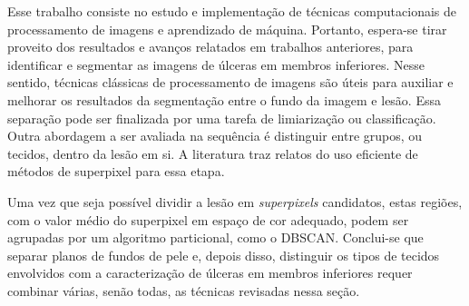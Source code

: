 Esse trabalho consiste no estudo e implementação de técnicas computacionais de processamento de imagens e aprendizado de máquina.
Portanto, espera-se tirar proveito dos resultados e avanços relatados em trabalhos anteriores, para identificar e segmentar as imagens de úlceras em membros inferiores.
Nesse sentido, técnicas clássicas de processamento de imagens são úteis para auxiliar e melhorar os resultados da segmentação entre o fundo da imagem e lesão.
Essa separação pode ser finalizada por uma tarefa de limiarização ou classificação.
Outra abordagem a ser avaliada na sequência é distinguir entre grupos, ou tecidos, dentro da lesão em si.
A literatura traz relatos do uso eficiente de métodos de superpixel para essa etapa.

Uma vez que seja possível dividir a lesão em \textit{superpixels} candidatos, estas regiões, com o valor médio do superpixel em espaço de cor adequado, podem ser agrupadas por um algoritmo particional, como o DBSCAN.
Conclui-se que separar planos de fundos de pele e, depois disso, distinguir os tipos de tecidos envolvidos com a caracterização de úlceras em membros inferiores requer combinar várias, senão todas, as técnicas revisadas nessa seção.
\newpage
\thispagestyle{plain} %
\mbox{}
